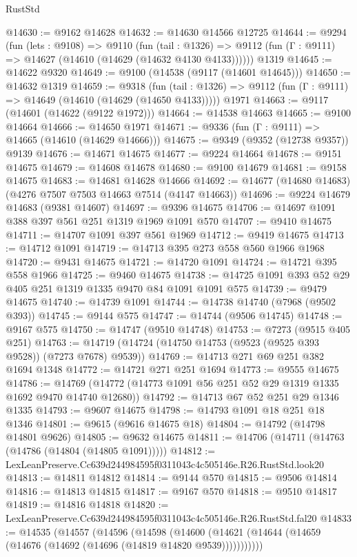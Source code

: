 \begin{lexlean}{RustStd}
\begin{coremodule}
@14630 := @9162 @14628
@14632 := @14630 @14566 @12725
@14644 := @9294
    (fun (lets : @9108) =>
    @9110
      (fun (tail : @1326) =>
      @9112 (fun (Γ : @9111) => @14627 (@14610 (@14629 (@14632 @4130 @4133))))))
    @1319
@14645 := @14622 @9320
@14649 := @9100 (@14538 (@9117 (@14601 @14645)))
@14650 := @14632 @1319
@14659 := @9318
    (fun (tail : @1326) => @9112 (fun (Γ : @9111) => @14649 (@14610 (@14629 (@14650 @4133)))))
    @1971
@14663 := @9117 (@14601 (@14622 (@9122 @1972)))
@14664 := @14538 @14663
@14665 := @9100 @14664
@14666 := @14650 @1971
@14671 := @9336 (fun (Γ : @9111) => @14665 (@14610 (@14629 @14666)))
@14675 := @9349 (@9352 (@12738 @9357)) @9139
@14676 := @14671 @14675
@14677 := @9224 @14664
@14678 := @9151 @14675
@14679 := @14608 @14678
@14680 := @9100 @14679
@14681 := @9158 @14675
@14683 := @14681 @14628 @14666
@14692 := @14677 (@14680 @14683) (@4276 @7507 @7503 @14663 @7514 (@4147 @14663))
@14696 := @9224 @14679 @14683 (@9381 @14607)
@14697 := @9396 @14675
@14706 := @14697 @1091 @388 @397 @561 @251 @1319 @1969 @1091 @570
@14707 := @9410 @14675
@14711 := @14707 @1091 @397 @561 @1969
@14712 := @9419 @14675
@14713 := @14712 @1091
@14719 := @14713 @395 @273 @558 @560 @1966 @1968
@14720 := @9431 @14675
@14721 := @14720 @1091
@14724 := @14721 @395 @558 @1966
@14725 := @9460 @14675
@14738 := @14725 @1091 @393 @52 @29 @405 @251 @1319 @1335 @9470 @84 @1091 @1091 @575
@14739 := @9479 @14675
@14740 := @14739 @1091
@14744 := @14738 @14740 (@7968 (@9502 @393))
@14745 := @9144 @575
@14747 := @14744 (@9506 @14745)
@14748 := @9167 @575
@14750 := @14747 (@9510 @14748)
@14753 := @7273 (@9515 @405 @251)
@14763 := @14719 (@14724 (@14750 @14753 (@9523 (@9525 @393 @9528)) (@7273 @7678) @9539))
@14769 := @14713 @271 @69 @251 @382 @1694 @1348
@14772 := @14721 @271 @251 @1694
@14773 := @9555 @14675
@14786 := @14769 (@14772 (@14773 @1091 @56 @251 @52 @29 @1319 @1335 @1692 @9470 @14740 @12680))
@14792 := @14713 @67 @52 @251 @29 @1346 @1335
@14793 := @9607 @14675
@14798 := @14793 @1091 @18 @251 @18 @1346
@14801 := @9615 (@9616 @14675 @18)
@14804 := @14792 (@14798 @14801 @9626)
@14805 := @9632 @14675
@14811 := @14706 (@14711 (@14763 (@14786 (@14804 (@14805 @1091)))))
@14812 := LexLeanPreserve.Cc639d244984595f0311043c4c505146e.R26.RustStd.look20
@14813 := @14811 @14812
@14814 := @9144 @570
@14815 := @9506 @14814
@14816 := @14813 @14815
@14817 := @9167 @570
@14818 := @9510 @14817
@14819 := @14816 @14818
@14820 := LexLeanPreserve.Cc639d244984595f0311043c4c505146e.R26.RustStd.fal20
@14833 := @14535
    (@14557
      (@14596
        (@14598
          (@14600 (@14621 (@14644 (@14659 (@14676 (@14692 (@14696 (@14819 @14820 @9539)))))))))))

\end{coremodule}
\end{lexlean}
